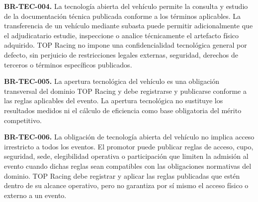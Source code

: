 \documentclass[10pt,letterpaper]{article}
\begin{document}
\noindent\textbf{BR-TEC-004.} La tecnología abierta del vehículo permite la consulta y estudio de la documentación técnica publicada conforme a los términos aplicables. La transferencia de un vehículo mediante subasta puede permitir adicionalmente que el adjudicatario estudie, inspeccione o analice técnicamente el artefacto físico adquirido. TOP Racing no impone una confidencialidad tecnológica general por defecto, sin perjuicio de restricciones legales externas, seguridad, derechos de terceros o términos específicos publicados.\par
\noindent\textbf{BR-TEC-005.} La apertura tecnológica del vehículo es una obligación transversal del dominio TOP Racing y debe registrarse y publicarse conforme a las reglas aplicables del evento. La apertura tecnológica no sustituye los resultados medidos ni el cálculo de eficiencia como base obligatoria del mérito competitivo.\par
\noindent\textbf{BR-TEC-006.} La obligación de tecnología abierta del vehículo no implica acceso irrestricto a todos los eventos. El promotor puede publicar reglas de acceso, cupo, seguridad, sede, elegibilidad operativa o participación que limiten la admisión al evento cuando dichas reglas sean compatibles con las obligaciones normativas del dominio. TOP Racing debe registrar y aplicar las reglas publicadas que estén dentro de su alcance operativo, pero no garantiza por sí mismo el acceso físico o externo a un evento.\par
\end{document}
